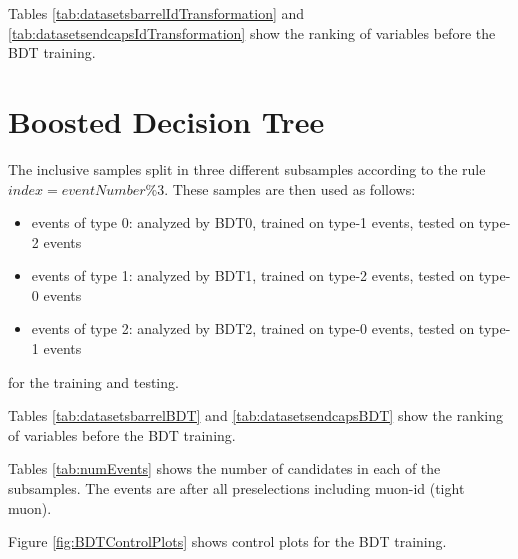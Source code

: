 \documentclass[10pt,a4paper]{article}
\begin{document}
Tables \ref{tab:datasetsbarrelIdTransformation} and \ref{tab:datasetsendcapsIdTransformation} show the ranking of variables before
the BDT training.






\section{Boosted Decision Tree}

The inclusive samples split in three different subsamples according to the rule $index = eventNumber\%3$.
These samples are then used as follows:
\begin{itemize}
\item events of type 0: analyzed by BDT0, trained on type-1 events, tested on type-2 events
\item events of type 1: analyzed by BDT1, trained on type-2 events, tested on type-0 events
\item events of type 2: analyzed by BDT2, trained on type-0 events, tested on type-1 events
\end{itemize}
for the training and testing.

Tables \ref{tab:datasetsbarrelBDT} and \ref{tab:datasetsendcapsBDT} show the ranking of variables before
the BDT training.



Tables \ref{tab:numEvents} shows the number of candidates in each of the subsamples. The events are after
all preselections including muon-id (tight muon).


Figure \ref{fig:BDTControlPlots} shows control plots for the BDT training.
\end{document}
